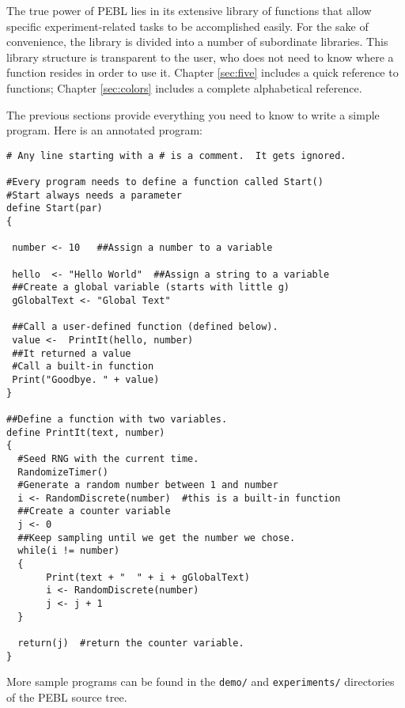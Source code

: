\vfill
{}

The true power of PEBL lies in its extensive library of
functions that allow specific experiment-related tasks to be
accomplished easily. For the sake of convenience, the library is divided into a number of subordinate libraries.  This library structure
is transparent to the user, who does not need to know where
a function resides in order to use it. Chapter \ref{sec:five} includes a quick reference to functions; Chapter \ref{sec:colors} includes a complete alphabetical reference.

\newpage
{}

The previous sections provide everything you need to know to
write a simple program.  Here is an annotated program:

\begin{verbatim}
# Any line starting with a # is a comment.  It gets ignored.

#Every program needs to define a function called Start() 
#Start always needs a parameter
define Start(par)
{

 number <- 10   ##Assign a number to a variable

 hello  <- "Hello World"  ##Assign a string to a variable
 ##Create a global variable (starts with little g)
 gGlobalText <- "Global Text"

 ##Call a user-defined function (defined below).
 value <-  PrintIt(hello, number)
 ##It returned a value
 #Call a built-in function
 Print("Goodbye. " + value)
}

##Define a function with two variables.
define PrintIt(text, number)
{
  #Seed RNG with the current time.
  RandomizeTimer()
  #Generate a random number between 1 and number
  i <- RandomDiscrete(number)  #this is a built-in function
  ##Create a counter variable
  j <- 0
  ##Keep sampling until we get the number we chose.
  while(i != number)
  {
       Print(text + "  " + i + gGlobalText)
       i <- RandomDiscrete(number)
       j <- j + 1
  }

  return(j)  #return the counter variable.
}
\end{verbatim}
More sample programs can be found in the \texttt{demo/} and \texttt{experiments/} directories of the PEBL source tree.


